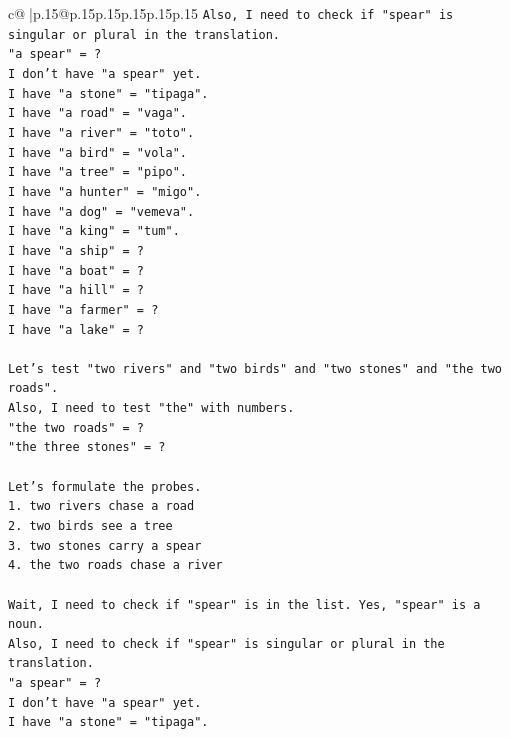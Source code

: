 \documentclass{article}
\begin{document}
{\begin{supertabular}{c@{$\;$}|p{.15\linewidth}@{}p{.15\linewidth}p{.15\linewidth}p{.15\linewidth}p{.15\linewidth}p{.15\linewidth}}
{{{\texttt{Also, I need to check if "spear" is singular or plural in the translation.} \\
\texttt{"a spear" = ?} \\
\texttt{I don't have "a spear" yet.} \\
\texttt{I have "a stone" = "tipaga".} \\
\texttt{I have "a road" = "vaga".} \\
\texttt{I have "a river" = "toto".} \\
\texttt{I have "a bird" = "vola".} \\
\texttt{I have "a tree" = "pipo".} \\
\texttt{I have "a hunter" = "migo".} \\
\texttt{I have "a dog" = "vemeva".} \\
\texttt{I have "a king" = "tum".} \\
\texttt{I have "a ship" = ?} \\
\texttt{I have "a boat" = ?} \\
\texttt{I have "a hill" = ?} \\
\texttt{I have "a farmer" = ?} \\
\texttt{I have "a lake" = ?} \\
\\ 
\texttt{Let's test "two rivers" and "two birds" and "two stones" and "the two roads".} \\
\texttt{Also, I need to test "the" with numbers.} \\
\texttt{"the two roads" = ?} \\
\texttt{"the three stones" = ?} \\
\\ 
\texttt{Let's formulate the probes.} \\
\texttt{1. two rivers chase a road} \\
\texttt{2. two birds see a tree} \\
\texttt{3. two stones carry a spear} \\
\texttt{4. the two roads chase a river} \\
\\ 
\texttt{Wait, I need to check if "spear" is in the list. Yes, "spear" is a noun.} \\
\texttt{Also, I need to check if "spear" is singular or plural in the translation.} \\
\texttt{"a spear" = ?} \\
\texttt{I don't have "a spear" yet.} \\
\texttt{I have "a stone" = "tipaga".} \\
}}}
\end{supertabular}}
\end{document}

